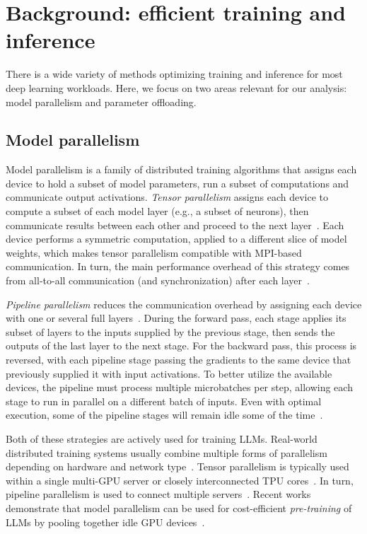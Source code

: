 \vspace{-3px}\section{Background: efficient training and inference}\label{sect:background}

There is a wide variety of methods optimizing training and inference for most deep learning workloads. %
Here, we focus on two areas relevant for our analysis: model parallelism and parameter offloading.

\subsection{Model parallelism}\label{sect:background_model_parallel}
Model parallelism is a family of distributed training algorithms that assigns each device to hold a subset of model parameters, run a subset of computations and communicate output activations. \textit{Tensor parallelism} assigns each device to compute a subset of each model layer (e.g., a subset of neurons), then communicate results between each other and proceed to the next layer~\citep{alexnet,model_parallelism_survey1,model_parallelism_survey2}. Each device performs a symmetric computation, applied to a different slice of model weights, which makes tensor parallelism compatible with MPI-based communication. In turn, the main performance overhead of this strategy comes from all-to-all communication (and synchronization) after each layer~\citep{krizhevsky2014oneweirdtrick}.

\textit{Pipeline parallelism} reduces the communication overhead by assigning each device with one or several full layers~\citep{huang2019gpipe,pipedream,pipemare}. During the forward pass, each stage applies its subset of layers to the inputs supplied by the previous stage, then sends the outputs of the last layer to the next stage. For the backward pass, this process is reversed, with each pipeline stage passing the gradients to the same device that previously supplied it with input activations. To better utilize the available devices, the pipeline must process multiple microbatches per step, allowing each stage to run in parallel on a different batch of inputs. Even with optimal execution, some of the pipeline stages will remain idle some of the time~\citep{huang2019gpipe}.

Both of these strategies are actively used for training LLMs. Real-world distributed training systems usually combine multiple forms of parallelism depending on hardware and network type~\citep{megatron2,zero,beyond_data_and_model}.
Tensor parallelism is typically used within a single multi-GPU server or closely interconnected TPU cores~\citep{megatron2,meshtensorflow}. In turn, pipeline parallelism is used to connect multiple servers~\citep{megatron2}. Recent works demonstrate that model parallelism can be used for cost-efficient \textit{pre-training} of LLMs by pooling together idle GPU devices~\citep{varuna,guarantees,bamboo,yuan2022decentralized,ryabinin2023swarm}.

